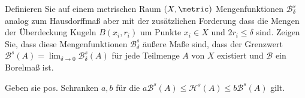 
\begin{exercise}

Definieren Sie auf einem metrischen Raum $(X, \metric)$ Mengenfunktionen $\mathcal{B}_\delta^s$ analog zum Hausdorffmaß aber mit der zusätzlichen Forderung dass die Mengen der Überdeckung Kugeln $B(x_i, r_i)$ um Punkte $x_i \in X$ und $2 r_i \leq \delta$ sind.
Zeigen Sie, dass diese Mengenfunktionen $\mathcal{B}_\delta^s$ äußere Maße sind, dass der Grenzwert
$\mathcal{B}^s(A) = \lim_{\delta \to 0} \mathcal{B}_\delta^s(A)$ für jede Teilmenge $A$ von $X$ existiert und $\mathcal{B}$ ein Borelmaß ist.

Geben sie pos. Schranken $a, b$ für die $a \mathcal{B}^s(A) \leq \mathcal{H}^s(A) \leq b \mathcal{B}^s(A)$ gilt.

\end{exercise}


